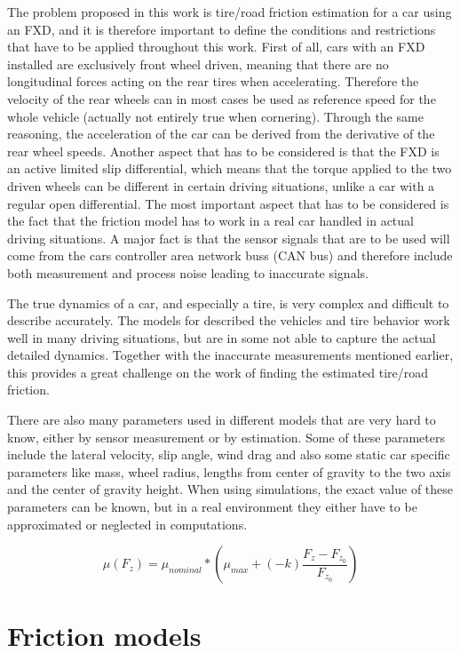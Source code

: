 The problem proposed in this work is tire/road friction estimation for a car using an FXD, and it is therefore important to define the conditions and restrictions that have to be applied throughout this work. First of all, cars with an FXD installed are exclusively front wheel driven, meaning that there are no longitudinal forces acting on the rear tires when accelerating. Therefore the velocity of the rear wheels can in most cases be used as reference speed for the whole vehicle (actually not entirely true when cornering). Through the same reasoning, the acceleration of the car can be derived from the derivative of the rear wheel speeds. Another aspect that has to be considered is that the FXD is an active limited slip differential, which means that the torque applied to the two driven wheels can be different in certain driving situations, unlike a car with a regular open differential. The most important aspect that has to be considered is the fact that the friction model has to work in a real car handled in actual driving situations. A major fact is that the sensor signals that are to be used  will come from the cars controller area network buss (CAN bus) and therefore include both measurement and process noise leading to inaccurate signals. 

The true dynamics of a car, and especially a tire, is very complex and difficult to describe accurately. The models for described the vehicles and tire behavior work well in many driving situations, but are in some not able to capture the actual detailed dynamics. Together with the inaccurate measurements mentioned earlier, this provides a great challenge on the work of finding the estimated tire/road friction. 

There are also many parameters used in different models that are very hard to know, either by sensor measurement or by estimation. Some of these parameters include the lateral velocity, slip angle, wind drag and also some static car specific parameters like mass, wheel radius, lengths from center of gravity to the two axis and the center of gravity height. When using simulations, the exact value of these parameters can be known, but in a real environment they either have to be approximated or neglected in computations. 

\begin{equation}
\mu(F_{z})=\mu_{nominal}*(\mu_{max} + (-k)\frac{F_{z} - F_{z_{0}}}{F_{z_{0}}})
\end{equation}

\section{Friction models}

